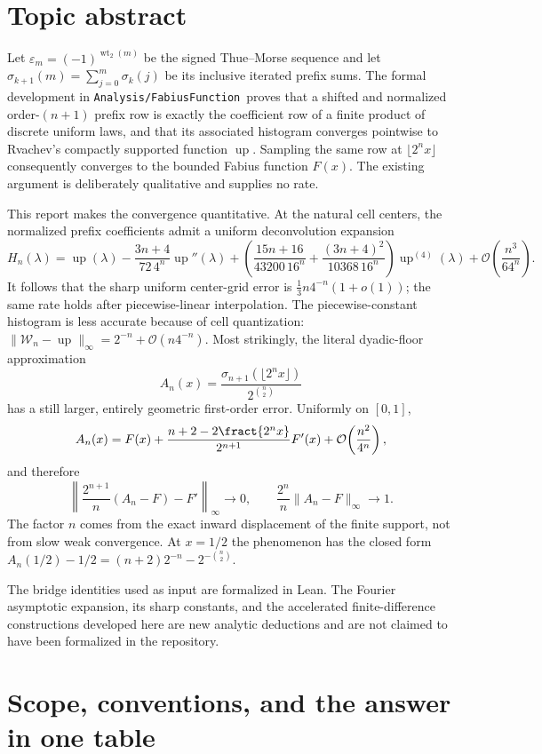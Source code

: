 \documentclass[11pt,oneside]{article}
\theoremstyle{definition}
\theoremstyle{remark}
\newcommand{\Up}{\operatorname{up}}
\newcommand{\wt}{\operatorname{wt}_2}
\newcommand{\bigO}{\mathcal O}
\newcommand{\repo}{\nolinkurl{Analysis/FabiusFunction}}
\begin{document}
\section*{Topic abstract}
Let $\varepsilon_m=(-1)^{\wt(m)}$ be the signed Thue--Morse sequence and let
$\sigma_{k+1}(m)=\sum_{j=0}^{m}\sigma_k(j)$ be its inclusive iterated prefix sums.  The
formal development in \repo\ proves that a shifted and normalized order-$(n+1)$ prefix row
is exactly the coefficient row of a finite product of discrete uniform laws, and that its
associated histogram converges pointwise to Rvachev's compactly supported function $\Up$.
Sampling the same row at $\lfloor 2^n x\rfloor$ consequently converges to the bounded Fabius
function $F(x)$.  The existing argument is deliberately qualitative and supplies no rate.

This report makes the convergence quantitative.  At the natural cell centers, the normalized
prefix coefficients admit a uniform deconvolution expansion
\[
 H_n(\lambda)=\Up(\lambda)
 -\frac{3n+4}{72\,4^n}\Up''(\lambda)
 +\left(\frac{15n+16}{43200\,16^n}
       +\frac{(3n+4)^2}{10368\,16^n}\right)\Up^{(4)}(\lambda)
 +\bigO\!\left(\frac{n^3}{64^n}\right).
\]
It follows that the sharp uniform center-grid error is
$\frac13 n4^{-n}(1+o(1))$; the same rate holds after piecewise-linear interpolation.
The piecewise-constant histogram is less accurate because of cell quantization:
$\|\mathcal W_n-\Up\|_\infty=2^{-n}+\bigO(n4^{-n})$.
Most strikingly, the literal dyadic-floor approximation
\[
 A_n(x)=\frac{\sigma_{n+1}(\lfloor2^n x\rfloor)}{2^{\binom n2}}
\]
has a still larger, entirely geometric first-order error.  Uniformly on $[0,1]$,
\[
 A_n(x)=F(x)+\frac{n+2-2\fract{2^nx}}{2^{n+1}}F'(x)
          +\bigO\!\left(\frac{n^2}{4^n}\right),
\]
and therefore
\[
 \left\|\frac{2^{n+1}}n(A_n-F)-F'\right\|_\infty\longrightarrow0,
 \qquad
 \frac{2^n}{n}\|A_n-F\|_\infty\longrightarrow1.
\]
The factor $n$ comes from the exact inward displacement of the finite support, not from slow
weak convergence.  At $x=1/2$ the phenomenon has the closed form
$A_n(1/2)-1/2=(n+2)2^{-n}-2^{-\binom n2}$.

The bridge identities used as input are formalized in Lean.  The Fourier asymptotic expansion,
its sharp constants, and the accelerated finite-difference constructions developed here are
new analytic deductions and are not claimed to have been formalized in the repository.


\section{Scope, conventions, and the answer in one table}
\label{tmrates:sec:scope}
\end{document}
